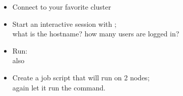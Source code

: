 \begin{exerciseframe}
  \begin{itemize}
  \item Connect to your favorite cluster
  \item Start an interactive session with ;\\
    what is the hostname? how many users are logged in?
  \item Run: \\
    also 
  \item Create a job script that will run on 2 nodes;\\
    again let it run the  command.
  \end{itemize}
\end{exerciseframe}
